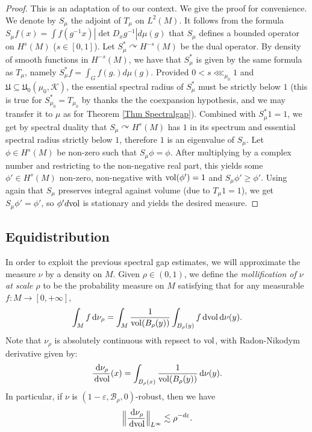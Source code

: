 \documentclass[11pt, leqno, fleqn]{amsart}
\def\cU{\mathfrak U}
\def\eps{\varepsilon}
\def\cB{          \mathcal B}
\newcommand{\normBig}[1]{\Bigl\lVert#1\Bigr\rVert}
\newcommand{\dd}{\,\mathrm{d}}
\newcommand{\acts}{\curvearrowright}
\newcommand{\cK}{{\mathcal K}}
\theoremstyle{definition}
\theoremstyle{definition}
\def \vol{  {\rm vol} }
\begin{document}
 	\begin{proof}
	This is an adaptation of \cite[Theorem 7.9]{DD} to our context. We give the proof for convenience. We denote by $S_{\mu}$ the adjoint of $T_{\mu}$ on $L^2(M)$. It follows from the formula $S_{\mu}f(x)=\int f(g^{-1}x) |\det D_{x}g^{-1}| d\mu(g)$ that $S_{\mu}$ defines a bounded operator on $H^s(M)$ ($s\in [0, 1]$). Let $S^*_{\mu} \acts H^{-s}(M)$ be the dual operator. By density of smooth functions in $H^{-s}(M)$, we have that $S^*_{\mu}$ is given by the same formula as $T_{\mu}$, namely $S^*_{\mu}f=\int_{G}f(g.)d\mu(g)$. Provided $0<s\lll_{\mu_{0}}1$ and  $\cU\subseteq \cU_{0}(\mu_{0},\cK)$, the essential spectral radius of  $S^*_{\mu}$   must be strictly below $1$ (this is true for  $S^*_{\mu_{0}} = T_{\mu_{0}}$   by \cite[Theorem 1.1]{DD} thanks the the coexpansion hypothesis, and we may transfer it to $\mu$ as for Theorem \ref{Thm Spectralgap}). Combined with  $S^*_{\mu} 1=1$,   we get by spectral duality that $S_{\mu}\acts H^s(M)$ has $1$ in its spectrum and essential spectral radius strictly below $1$, therefore $1$ is an eigenvalue of $S_{\mu}$. Let $\phi\in H^s(M)$ be non-zero such that $S_{\mu}\phi =\phi$. After  multiplying by a complex number and restricting to the non-negative real part, this yields some $\phi'\in H^s(M)$ non-zero, non-negative with $\vol(\phi')=1$ and  $S_{\mu} \phi'\geq \phi'$. Using again that $S_{\mu}$ preserves integral against volume (due to $T_{\mu}1=1$), we get $S_{\mu}\phi'=\phi'$, so $\phi' d\vol$ is stationary and yields the desired measure.
	
 	\end{proof}





\subsection{Equidistribution}

 In order to exploit the previous spectral gap estimates, we will approximate the measure $\nu$ by a density on $M$.  Given $\rho\in (0, 1)$,  we define the \emph{mollification of $\nu$ at  scale $\rho$} to be the probability measure on $M$ satisfying that
for any measurable $f \colon M\rightarrow {[0, +\infty]}$,
\begin{align} \label{defnurho}
\int_M f \dd \nu_\rho = \int_M  \frac{1}{\vol(B_\rho(y))} \int_{B_\rho(y)} f \dd\vol\dd \nu (y).
\end{align} 
 Note that $\nu_{\rho}$ is absolutely continuous with repsect to $\vol$, with  Radon-Nikodym derivative given by:
\[
\frac{\dd \nu_{\rho}}{\dd \vol}(x) =  \int_{B_\rho(x)}\frac{1}{\vol(B_\rho(y))}\dd \nu(y).
\]
In particular, if $\nu$ is $(1-\eps, \cB_{\rho}, 0)$-robust, then we have 
\begin{align} \label{bndpsirho}
\normBig{\frac{\dd \nu_{\rho}}{\dd \vol}  }_{L^\infty}\lesssim \rho^{-d\eps}.
 \end{align} 
\end{document}
